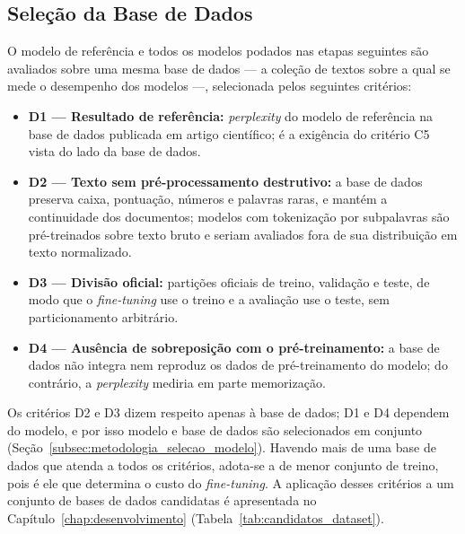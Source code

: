 \subsection{Seleção da Base de Dados}\label{subsec:metodologia_base}

O modelo de referência e todos os modelos podados nas etapas seguintes são avaliados sobre
uma mesma base de dados --- a coleção de textos sobre a qual se mede o desempenho dos
modelos ---, selecionada pelos seguintes critérios:

\begin{itemize}
    \item \textbf{D1 --- Resultado de referência:} \textit{perplexity} do modelo de
          referência na base de dados publicada em artigo científico; é a exigência do
          critério C5 vista do lado da base de dados.
    \item \textbf{D2 --- Texto sem pré-processamento destrutivo:} a base de dados preserva caixa,
          pontuação, números e palavras raras, e mantém a continuidade dos documentos;
          modelos com tokenização por subpalavras são pré-treinados sobre texto bruto e
          seriam avaliados fora de sua distribuição em texto normalizado.
    \item \textbf{D3 --- Divisão oficial:} partições oficiais de treino, validação e teste,
          de modo que o \textit{fine-tuning} use o treino e a avaliação use o teste, sem
          particionamento arbitrário.
    \item \textbf{D4 --- Ausência de sobreposição com o pré-treinamento:} a base de dados não
          integra nem reproduz os dados de pré-treinamento do modelo; do contrário, a
          \textit{perplexity} mediria em parte memorização.
\end{itemize}

Os critérios D2 e D3 dizem respeito apenas à base de dados; D1 e D4 dependem do modelo, e
por isso modelo e base de dados são selecionados em conjunto (Seção~\ref{subsec:metodologia_selecao_modelo}).
Havendo mais de uma base de dados que atenda a todos os critérios, adota-se a de menor conjunto de
treino, pois é ele que determina o custo do \textit{fine-tuning}. A aplicação desses
critérios a um conjunto de bases de dados candidatas é apresentada no
Capítulo~\ref{chap:desenvolvimento} (Tabela~\ref{tab:candidatos_dataset}).

